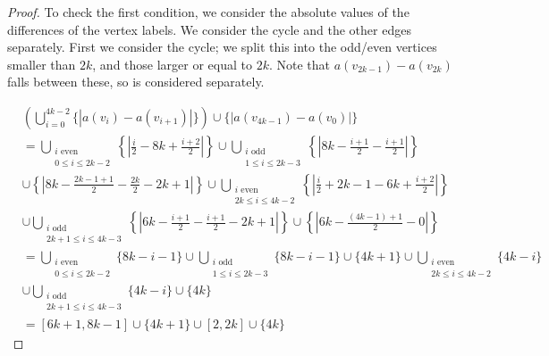 \documentclass[12pt, a4paper]{article}
\theoremstyle{definition}
\begin{document}
\begin{proof}
To check the first condition, we consider the absolute values of the differences of the vertex labels. We consider the cycle and the other edges separately.  First we consider the cycle; we split this into the odd/even vertices smaller than $2k$, and those larger or equal to $2k$. Note that $a(v_{2k-1})-a(v_{2k})$ falls between these, so is considered separately.

\begin{align*}
&  \left( \bigcup^{4k-2}_{i=0}\{|a(v_i)-a(v_{i+1})|\} \right) \cup \{|a(v_{4k-1})-a(v_{0})|\}\\
&= \bigcup_{\substack{i \text{ even } \\ 0 \leq i \leq 2k-2}} \left\{\left|\frac{i}{2}-8k+\frac{i+2}{2}\right|\right\} \cup  \bigcup_{\substack{i \text{ odd } \\ 1 \leq i \leq 2k-3}}\left\{\left|8k-\frac{i+1}{2}-\frac{i+1}{2}\right|\right\} \\
&\cup \left\{\left|8k-\frac{2k-1+1}{2}-\frac{2k}{2}-2k+1\right|\right\} \cup \bigcup_{\substack{i \text{ even } \\ 2k \leq i \leq 4k-2}}\left\{\left|\frac{i}{2}+2k-1-6k+\frac{i+2}{2}\right|\right\}\\
&\cup \bigcup_{\substack{i \text{ odd } \\ 2k+1 \leq i \leq 4k-3}}\left\{\left|6k-\frac{i+1}{2}-\frac{i+1}{2}-2k+1\right|\right\} \cup \left\{\left|6k-\frac{(4k-1)+1}{2}-0\right|\right\}\\
&= \bigcup_{\substack{i \text{ even } \\ 0 \leq i \leq 2k-2}}\{8k-i-1\}  \cup \bigcup_{\substack{i \text{ odd } \\ 1 \leq i \leq 2k-3}}\{8k-i-1\} \cup\{4k+1\}\cup \bigcup_{\substack{i \text{ even } \\ 2k \leq i \leq 4k-2}}\{4k-i\}\\
&\cup \bigcup_{\substack{i \text{ odd } \\ 2k+1 \leq i \leq 4k-3}}\{4k-i\} \cup\{4k\}\\
&=[6k+1,8k-1]\cup\{4k+1\}\cup[2,2k]\cup\{4k\}
\end{align*}


\end{proof}
\end{document}
